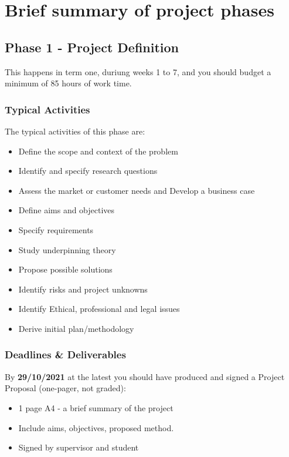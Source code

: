 \section{Brief summary of project phases}

\subsection{Phase 1 - Project Definition}

This happens in term one, duriung weeks 1 to 7, and you should budget a minimum of 85 hours of work time.

\subsubsection{Typical Activities}

The typical activities of this phase are:

\begin{itemize}
    \item Define the scope and context of the problem
    \item Identify and specify research questions
    \item Assess the market or customer needs and Develop a business case
    \item Define aims and objectives
    \item Specify requirements
    \item Study underpinning theory
    \item Propose possible solutions
    \item Identify risks and project unknowns
    \item Identify Ethical, professional and legal issues
    \item Derive initial plan/methodology
\end{itemize}

\subsubsection{Deadlines \& Deliverables}

By \textbf{29/10/2021} at the latest you should have produced and signed a Project Proposal (one-pager, not graded):

\begin{itemize}
    \item 1 page A4 - a brief summary of the project
    \item Include aims, objectives, proposed method.
    \item Signed by supervisor and student
\end{itemize}

